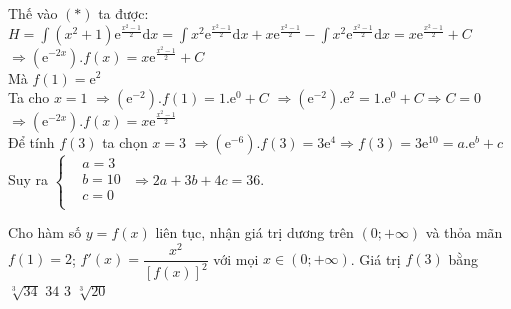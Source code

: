 \begin{ex}
{		Thế vào $(*)$ ta được: $H=\displaystyle\int{\left(x^2+1\right){\mathrm{e}^{\frac{x^2-1}{2}}}\mathrm{d}x}=\displaystyle\int{x^2\mathrm{e}^{\frac{x^2-1}{2}}\mathrm{d}x}+x{\mathrm{e}^{\frac{x^2-1}{2}}}-\displaystyle\int{x^2\mathrm{e}^{\frac{x^2-1}{2}}\mathrm{d}x}=x{\mathrm{e}^{\frac{x^2-1}{2}}}+C$\\
		$\Rightarrow\left(\mathrm{e}^{-2x}\right).f(x)=x{\mathrm{e}^{\frac{x^2-1}{2}}}+C$\\
		Mà $f(1)=\mathrm{e}^2$\\
		Ta cho $ x=1$ $\Rightarrow\left(\mathrm{e}^{-2}\right).f(1)=1.\mathrm{e}^0+C$ $\Rightarrow\left(\mathrm{e}^{-2}\right).\mathrm{e}^2=1.\mathrm{e}^0+C\Rightarrow C=0$ \\
		$\Rightarrow\left(\mathrm{e}^{-2x}\right).f(x)=x{\mathrm{e}^{\frac{x^2-1}{2}}}$\\
		Để tính $ f(3)$ ta chọn $ x=3$ $\Rightarrow\left(\mathrm{e}^{-6}\right).f(3)=3\mathrm{e}^4\Rightarrow f(3)=3\mathrm{e}^{10}=a.\mathrm{e}^b+c$\\
		Suy ra $\left\{\begin{aligned}
			& a=3\\ 
			& b=10\\ 
			& c=0\\ 
		\end{aligned}\right.$ $\Rightarrow 2a+3b+4c=36$.
	}
\end{ex}
\begin{ex}
	Cho hàm số $ y=f(x)$ liên tục, nhận giá trị dương trên $\left(0;+\infty\right)$ và thỏa mãn $ f(1)=2$; $f'(x)=\dfrac{x^2}{\left[f(x)\right]^2}$ với mọi $ x\in\left(0;+\infty\right)$. Giá trị $ f(3)$ bằng
	\choice
	{\True $\sqrt[3]{34}$}
	{$ 34$}
	{$ 3$}
	{$\sqrt[3]{20}$}
\end{ex}
